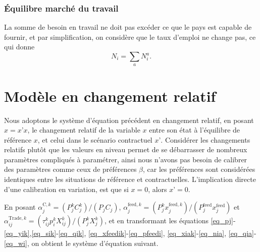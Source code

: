 \subsubsection{Équilibre marché du travail}
La somme de besoin en travail ne doit pas excéder ce que le pays est capable de fournir, et par simplification, on considère que le taux d’emploi ne change pas, ce qui donne
\begin{equation}\label{eq_wi}
    N_i=\sum_a N_i^a.
\end{equation}

\section{Modèle en changement relatif}

Nous adoptons le système d’équation précédent en changement relatif, en posant $\hat{x} = x’ x$, le changement relatif de la variable $x$ entre son état à l’équilibre de référence $x$, et celui dans le scénario contractuel $x’$. Considérer les changements relatifs plutôt que les valeurs en niveau permet de se débarrasser de nombreux paramètres compliqués à paramétrer, ainsi nous n’avons pas besoin de calibrer des paramètres comme ceux de préférences $\beta$, car les préférences sont considérées identiques entre les situations de référence et contractuelles. L’implication directe d’une calibration en variation, est que si $x = 0$, alors $x’ = 0$.

En posant $\alpha_j^{\text{C},k} = {(P_j^k C_j^k)}/{(P_j C_j)}$, $\alpha^{\text{feed},k}_j = {(P_j^k x^{\text{feed},k}_j)} /{(P^\text{feed}_j x^\text{feed}_j)}$ et $\alpha^{\text{Trade},k}_{ij} = (\tau_{ij}^k p_i^k X_{ij}^k)/(P_j^kX_{j}^k)$, et en transformant les équations \ref{eq_pj}-\ref{eq_yik},\ref{eq_sik}-\ref{eq_qik}, \ref{eq_xfeedik}-\ref{eq_pfeedi}, \ref{eq_xiak}-\ref{eq_nia}, \ref{eq_qia}-\ref{eq_wi}, on obtient le système d’équation suivant.

